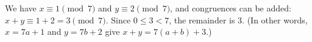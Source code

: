 We have $x\equiv1\pmod7$ and $y\equiv2\pmod7$, and congruences can be added: $x+y\equiv1+2=3\pmod7$. Since $0\le3<7$, the remainder is $\boxed{3}$. (In other words, $x=7a+1$ and $y=7b+2$ give $x+y=7(a+b)+3$.)
